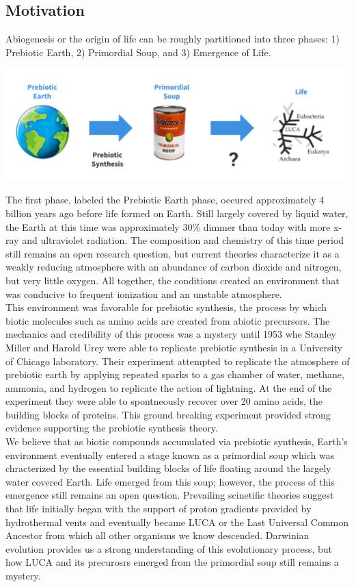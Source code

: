 \documentclass[11pt]{article}
\begin{document}
\subsection{Motivation}

Abiogenesis or the origin of life can be roughly partitioned into three phases: 1) Prebiotic Earth, 2) Primordial Soup, and 3) Emergence of Life. 

\includegraphics[width=\textwidth]{origin_of_life}

The first phase, labeled the Prebiotic Earth phase, occured approximately 4 billion years ago before life formed on Earth.
Still largely covered by liquid water, the Earth at this time was approximately 30\% dimmer than today with more x-ray and ultraviolet radiation.
The composition and chemistry of this time period still remains an open research question, but current theories characterize it as a weakly reducing atmosphere with an abundance of carbon dioxide and nitrogen, but very little oxygen.
All together, the conditions created an environment that was conducive to frequent ionization and an unstable atmosphere. \\

This environment was favorable for prebiotic synthesis, the process by which biotic molecules such as amino acids are created from abiotic precursors.
The mechanics and credibility of this process was a mystery until 1953 whe Stanley Miller and Harold Urey were able to replicate prebiotic synthesis in a University of Chicago laboratory.
Their experiment attempted to replicate the atmosphere of prebiotic earth by applying repeated sparks to a gas chamber of water, methane, ammonia, and hydrogen to replicate the action of lightning.
At the end of the experiment they were able to spontneously recover over 20 amino acids, the building blocks of proteins. 
This ground breaking experiment provided strong evidence supporting the prebiotic synthesis theory. \\

We believe that as biotic compounds accumulated via prebiotic synthesis, Earth's environment eventually entered a stage known as a primordial soup which was chracterized by the essential building blocks of life floating around the largely water covered Earth.
Life emerged from this soup; however, the process of this emergence still remains an open question.
Prevailing scinetific theories suggest that life initially began with the support of proton gradients provided by hydrothermal vents and eventually became LUCA or the Last Universal Common Ancestor from which all other organisms we know descended.  
Darwinian evolution provides us a strong understanding of this evolutionary process, but how LUCA and its precurosrs emerged from the primordial soup still remains a mystery.
\end{document}
